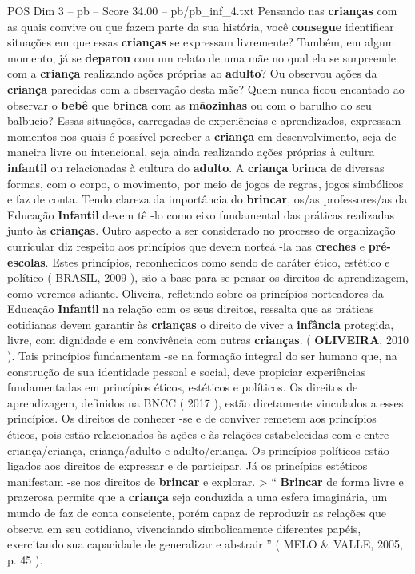 \begin{textsample}{POS Dim 3 – pb – Score 34.00 – pb/pb\_inf\_4.txt}
Pensando nas \textbf{crianças} com as quais convive ou que fazem parte da sua história, você \textbf{consegue} identificar situações em que essas \textbf{crianças} se expressam livremente?
Também, em algum momento, já se \textbf{deparou} com um relato de uma mãe no qual ela se surpreende com a \textbf{criança} realizando ações próprias ao \textbf{adulto}?
Ou observou ações da \textbf{criança} parecidas com a observação desta mãe?
Quem nunca ficou encantado ao observar o \textbf{bebê} que \textbf{brinca} com as \textbf{mãozinhas} ou com o barulho do seu balbucio?
Essas situações, carregadas de experiências e aprendizados, expressam momentos nos quais é possível perceber a \textbf{criança} em desenvolvimento, seja de maneira livre ou intencional, seja ainda realizando ações próprias à cultura \textbf{infantil} ou relacionadas à cultura do \textbf{adulto}.
A \textbf{criança} \textbf{brinca} de diversas formas, com o corpo, o movimento, por meio de jogos de regras, jogos simbólicos e faz de conta.
Tendo clareza da importância do \textbf{brincar}, os/as professores/as da Educação \textbf{Infantil} devem tê -lo como eixo fundamental das práticas realizadas junto às \textbf{crianças}.
Outro aspecto a ser considerado no processo de organização curricular diz respeito aos princípios que devem norteá -la nas \textbf{creches} e \textbf{pré-escolas}.
Estes princípios, reconhecidos como sendo de caráter ético, estético e político ( BRASIL, 2009 ), são a base para se pensar os direitos de aprendizagem, como veremos adiante.
Oliveira, refletindo sobre os princípios norteadores da Educação \textbf{Infantil} na relação com os seus direitos, ressalta que as práticas cotidianas devem garantir às \textbf{crianças} o direito de viver a \textbf{infância} protegida, livre, com dignidade e em convivência com outras \textbf{crianças}. ( \textbf{OLIVEIRA}, 2010 ).
Tais princípios fundamentam -se na formação integral do ser humano que, na construção de sua identidade pessoal e social, deve propiciar experiências fundamentadas em princípios éticos, estéticos e políticos.
Os direitos de aprendizagem, definidos na BNCC ( 2017 ), estão diretamente vinculados a esses princípios.
Os direitos de conhecer -se e de conviver remetem aos princípios éticos, pois estão relacionados às ações e às relações estabelecidas com e entre criança/criança, criança/adulto e adulto/criança.
Os princípios políticos estão ligados aos direitos de expressar e de participar.
Já os princípios estéticos manifestam -se nos direitos de \textbf{brincar} e explorar. > “ \textbf{Brincar} de forma livre e prazerosa permite que a \textbf{criança} seja conduzida a uma esfera imaginária, um mundo de faz de conta consciente, porém capaz de reproduzir as relações que observa em seu cotidiano, vivenciando simbolicamente diferentes papéis, exercitando sua capacidade de generalizar e abstrair ” ( MELO \& VALLE, 2005, p. 45 ).

\end{textsample}
